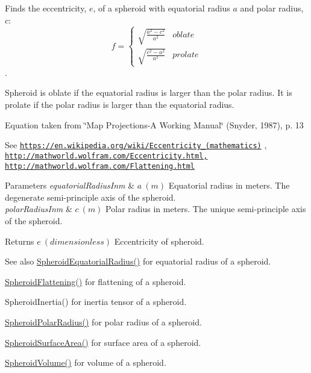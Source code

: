 Finds the eccentricity, $e$, of a spheroid with equatorial radius $a$ and polar radius, $c$\+: \[ f =\begin{cases} \sqrt{\frac{a^2-c^2}{a^2}} & oblate \\ \sqrt{\frac{c^2-a^2}{a^2}} & prolate \end{cases} \]. 

Spheroid is oblate if the equatorial radius is larger than the polar radius. It is prolate if the polar radius is larger than the equatorial radius.

Equation taken from \char`\"{}\+Map Projections-\/\+A Working Manual\char`\"{} (Snyder, 1987), p. 13

See \href{https://en.wikipedia.org/wiki/Eccentricity_(mathematics)}{\tt https\+://en.\+wikipedia.\+org/wiki/\+Eccentricity\+\_\+(mathematics)} , \href{http://mathworld.wolfram.com/Eccentricity.html,}{\tt http\+://mathworld.\+wolfram.\+com/\+Eccentricity.\+html,} \href{http://mathworld.wolfram.com/Flattening.html}{\tt http\+://mathworld.\+wolfram.\+com/\+Flattening.\+html} 
\begin{DoxyParams}{Parameters}
{\em equatorial\+Radius\+Inm} & $ a\ (m)$ Equatorial radius in meters. The degenerate semi-\/principle axis of the spheroid. \\
\hline
{\em polar\+Radius\+Inm} & $ c\ (m)$ Polar radius in meters. The unique semi-\/principle axis of the spheroid. \\
\hline
\end{DoxyParams}
\begin{DoxyReturn}{Returns}
$ e\ (dimensionless)$ Eccentricity of spheroid. 
\end{DoxyReturn}
\begin{DoxySeeAlso}{See also}
\mbox{\hyperlink{group___e_g_x_math-_geometry-3_d-_spheroid-_equatorial_radius_ga1cbe564fee1b509c622d1c6d276158cd}{Spheroid\+Equatorial\+Radius()}} for equatorial radius of a spheroid. 

\mbox{\hyperlink{group___e_g_x_math-_geometry-3_d-_spheroid-_flattening_ga05e3be91f5f7fbaa9371687aa3834179}{Spheroid\+Flattening()}} for flattening of a spheroid. 

Spheroid\+Inertia() for inertia tensor of a spheroid. 

\mbox{\hyperlink{group___e_g_x_math-_geometry-3_d-_spheroid-_polar_radius_gad4791a46a7efe39c63c03d2366fdd3d2}{Spheroid\+Polar\+Radius()}} for polar radius of a spheroid. 

\mbox{\hyperlink{group___e_g_x_math-_geometry-3_d-_spheroid-_surface_area_ga5a3580e7ded82cb678a558905f41ae49}{Spheroid\+Surface\+Area()}} for surface area of a spheroid. 

\mbox{\hyperlink{group___e_g_x_math-_geometry-3_d-_spheroid-_volume_ga12125484235e94b8f2580f3476b05b92}{Spheroid\+Volume()}} for volume of a spheroid. 
\end{DoxySeeAlso}
